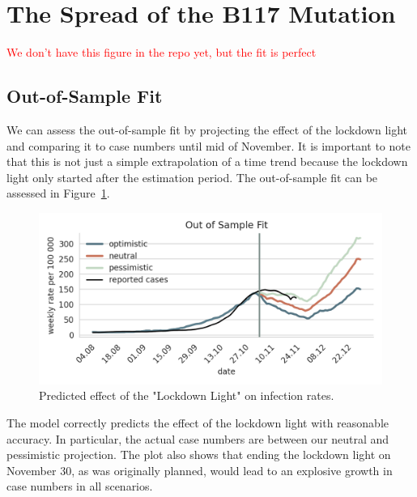 \FloatBarrier


\section{The Spread of the B117 Mutation}


\textcolor{red}{We don't have this figure in the repo yet, but the fit is perfect}



\FloatBarrier

\subsection{Out-of-Sample Fit}
\label{sub:out_of_sample_fit}

We can assess the out-of-sample fit by projecting the effect of the lockdown light and
comparing it to case numbers until mid of November. It is important to note that this
is not just a simple extrapolation of a time trend because the lockdown light only started
after the estimation period. The out-of-sample fit can be assessed in
Figure~\ref{fig:out-of-sample-fit}.

\begin{figure}[!tp]
    \centering
    \includegraphics[width=\textwidth]{../figures/out_of_sample_validation}
    \caption{Predicted effect of the "Lockdown Light" on infection rates.}
    \label{fig:out-of-sample-fit}
\end{figure}

The model correctly predicts the effect of the lockdown light with reasonable accuracy.
In particular, the actual case numbers are between our neutral and pessimistic
projection. The plot also shows that ending the lockdown light on November 30, as was
originally planned, would lead to an explosive growth in case numbers in all scenarios.
